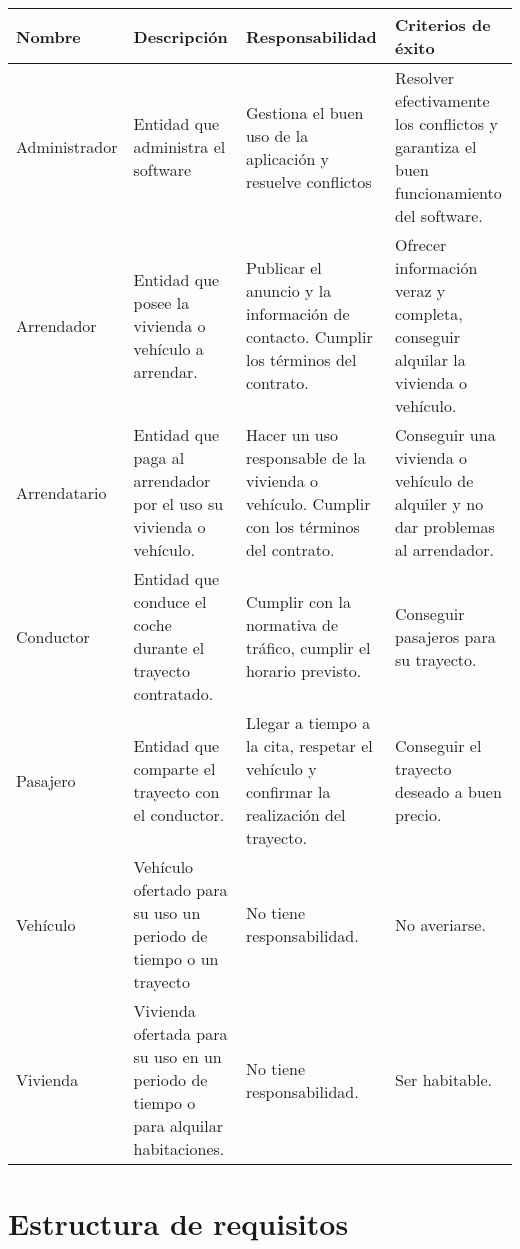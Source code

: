 \documentclass[11pt,spanish]{article} %
\begin{document}
\begin{table}[H]
	\centering
		\begin{tabular}{|p{0.9in}|p{1.5in}|p{2in}|p{2in}|}
			\hline
			Nombre & Descripción & Responsabilidad & Criterios de éxito \\ \hline
			
			Administrador & Entidad que administra el software & Gestiona el buen uso de la aplicación y resuelve conflictos & Resolver efectivamente los conflictos y garantiza el buen funcionamiento del software. \\ \hline
			
			Arrendador & Entidad que posee la vivienda o vehículo a arrendar. & Publicar el anuncio y la información de contacto. Cumplir los términos del contrato. & Ofrecer información veraz y completa, conseguir alquilar la vivienda o vehículo. \\ \hline
			
			Arrendatario & Entidad que paga al arrendador por el uso su vivienda o vehículo. & Hacer un uso responsable de la vivienda o vehículo. Cumplir con los términos del contrato. & Conseguir una vivienda o vehículo de alquiler y no dar problemas al arrendador. \\ \hline
			
			Conductor & Entidad que conduce el coche durante el trayecto contratado. & Cumplir con la normativa de tráfico, cumplir el horario previsto. & Conseguir pasajeros para su trayecto. \\ \hline
			
			Pasajero & Entidad que comparte el trayecto con el conductor. & Llegar a tiempo a la cita, respetar el vehículo y confirmar la realización del trayecto. & Conseguir el trayecto deseado a buen precio. \\ \hline
			
			Vehículo & Vehículo ofertado para su uso un periodo de tiempo o un trayecto & No tiene responsabilidad. & No averiarse. \\ \hline
			
			Vivienda & Vivienda ofertada para su uso en un periodo de tiempo o para alquilar habitaciones. & No tiene responsabilidad. & Ser habitable.\\ \hline
		\end{tabular}%

\end{table}




\section{Estructura de requisitos}
\end{document}
